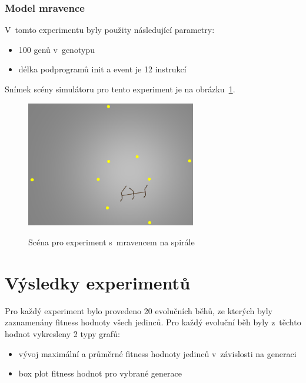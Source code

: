 \subsection{Model mravence}

V~tomto experimentu byly použity následující parametry:
\begin{itemize}
    \item 100 genů v~genotypu
    \item délka podprogramů init a event je 12 instrukcí
\end{itemize}

Snímek scény simulátoru pro tento experiment je na obrázku~\ref{fig:mravenec_spirala_zhora}.
\begin{figure}[h]
    \centering
    {\includegraphics[width=20em]{obrazky/mravenec_spirala_zhora.png}}
    \caption{
    Scéna pro experiment s~mravencem na spirále
    }
    \label{fig:mravenec_spirala_zhora}
\end{figure}


\chapter{Výsledky experimentů}
\label{chap:vysledky}
Pro každý experiment bylo provedeno 20 evolučních běhů, ze kterých byly zaznamenány fitness hodnoty všech jedinců.
Pro každý evoluční běh byly z~těchto hodnot vykresleny 2 typy grafů:

\begin{itemize}
    \item vývoj maximální a průměrné fitness hodnoty jedinců v~závislosti na generaci
    \item box plot fitness hodnot pro vybrané generace
\end{itemize}

